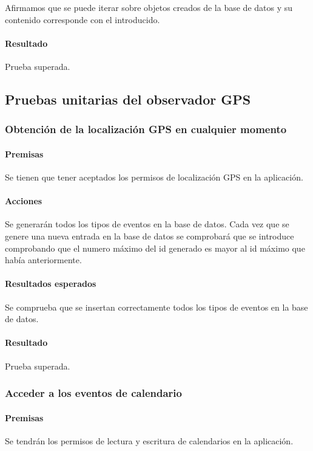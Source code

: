 Afirmamos que se puede iterar sobre objetos creados de la base de datos y su contenido corresponde con el introducido.

\paragraph{Resultado}
Prueba superada.

\subsection{Pruebas unitarias del observador GPS}

\subsubsection{Obtención de la localización GPS en cualquier momento}

\paragraph{Premisas}
Se tienen que tener aceptados los permisos de localización GPS en la aplicación.


\paragraph{Acciones}
Se generarán todos los tipos de eventos en la base de datos.
Cada vez que se genere una nueva entrada en la base de datos se comprobará que se introduce comprobando que el numero máximo del id generado es mayor al id máximo que había anteriormente.

\paragraph{Resultados esperados}

Se comprueba que se insertan correctamente todos los tipos de eventos en la base de datos.

\paragraph{Resultado}
Prueba superada.

\subsubsection{Acceder a los eventos de calendario}

\paragraph{Premisas}
Se tendrán los permisos de lectura y escritura de calendarios en la aplicación.


